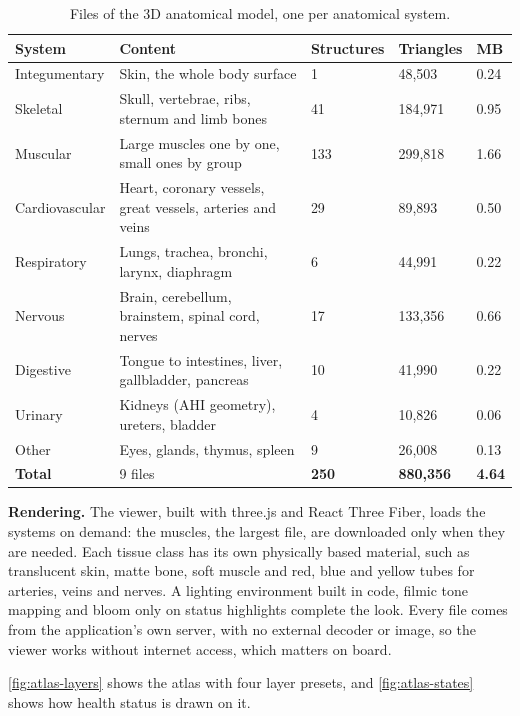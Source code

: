 \begin{table}[htbp]
\centering
\vspace{0.8em}
\caption{Files of the 3D anatomical model, one per anatomical system.}
\label{tab:3d-systems}
\footnotesize
\begin{tabular}{p{2.6cm}p{6.6cm}p{1.6cm}p{1.6cm}p{1.2cm}}
\hline
\textbf{System} & \textbf{Content} & \textbf{Structures} & \textbf{Triangles} & \textbf{MB} \\
\hline
Integumentary & Skin, the whole body surface & 1 & 48,503 & 0.24 \\
Skeletal & Skull, vertebrae, ribs, sternum and limb bones & 41 & 184,971 & 0.95 \\
Muscular & Large muscles one by one, small ones by group & 133 & 299,818 & 1.66 \\
Cardiovascular & Heart, coronary vessels, great vessels, arteries and veins & 29 & 89,893 & 0.50 \\
Respiratory & Lungs, trachea, bronchi, larynx, diaphragm & 6 & 44,991 & 0.22 \\
Nervous & Brain, cerebellum, brainstem, spinal cord, nerves & 17 & 133,356 & 0.66 \\
Digestive & Tongue to intestines, liver, gallbladder, pancreas & 10 & 41,990 & 0.22 \\
Urinary & Kidneys (AHI geometry), ureters, bladder & 4 & 10,826 & 0.06 \\
Other & Eyes, glands, thymus, spleen & 9 & 26,008 & 0.13 \\
\hline
\textbf{Total} & 9 files & \textbf{250} & \textbf{880,356} & \textbf{4.64} \\
\hline
\end{tabular}
\vspace{1.2em}
\end{table}

\medskip\noindent\textbf{Rendering.} The viewer, built with three.js and React Three Fiber, loads the systems on demand: the muscles, the largest file, are downloaded only when they are needed. Each tissue class has its own physically based material, such as translucent skin, matte bone, soft muscle and red, blue and yellow tubes for arteries, veins and nerves. A lighting environment built in code, filmic tone mapping and bloom only on status highlights complete the look. Every file comes from the application's own server, with no external decoder or image, so the viewer works without internet access, which matters on board.

\ref{fig:atlas-layers} shows the atlas with four layer presets, and \ref{fig:atlas-states} shows how health status is drawn on it.

